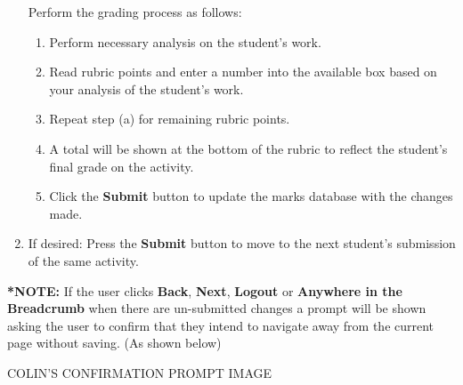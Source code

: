\documentclass{article}
\begin{document}
\begin{enumerate}
\begin{center}
    \end{center}
    Perform the grading process as follows:
    \begin{enumerate}
      \item Perform necessary analysis on the student's work. 
      \item Read rubric points and enter a number into the available box 
      based on your analysis of the student's work.
      \item Repeat step (a) for remaining rubric points.
      \item A total will be shown at the bottom of the rubric to reflect the
       student's final grade on the activity.
      \item Click the \textbf{Submit} button to update the marks database with
      the changes made.
    \end{enumerate}

	\item If desired: Press the \textbf{Submit} button to move to the next student's
	submission of the same activity.
\end{enumerate}
\textbf{*NOTE: }If the user clicks \textbf{Back}, \textbf{Next}, \textbf{Logout} or \textbf{Anywhere in the Breadcrumb} when there are un-submitted changes a prompt will be shown asking the user to confirm that they intend to navigate away from the current page without saving. (As shown below)

	\begin{center}
      COLIN'S CONFIRMATION PROMPT IMAGE
    \end{center}
\end{document}
